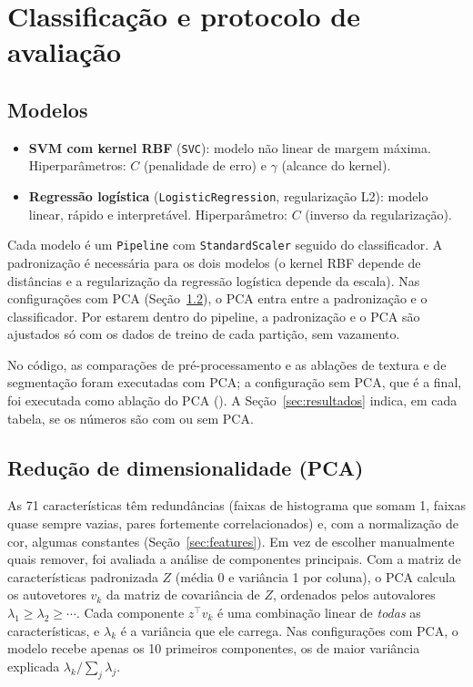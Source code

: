 \documentclass[11pt,a4paper]{article}
\newcommand{\arq}[1]{\path{#1}}
\begin{document}
\section{Classificação e protocolo de avaliação}\label{sec:classificacao}

\subsection{Modelos}

\begin{itemize}
  \item \textbf{SVM com kernel RBF} (\texttt{SVC}): modelo não linear de margem máxima. Hiperparâmetros:
        $C$ (penalidade de erro) e $\gamma$ (alcance do kernel).
  \item \textbf{Regressão logística} (\texttt{LogisticRegression}, regularização L2): modelo linear,
        rápido e interpretável. Hiperparâmetro: $C$ (inverso da regularização).
\end{itemize}

Cada modelo é um \texttt{Pipeline} com \texttt{StandardScaler} seguido do classificador. A
padronização é necessária para os dois modelos (o kernel RBF depende de distâncias e a regularização
da regressão logística depende da escala). Nas configurações com PCA (Seção~\ref{sec:pca}), o PCA
entra entre a padronização e o classificador. Por estarem dentro do pipeline, a padronização e o PCA
são ajustados só com os dados de treino de cada partição, sem vazamento.

No código, as comparações de pré-processamento e as ablações de textura e de segmentação foram
executadas com PCA; a configuração sem PCA, que é a final, foi executada como ablação do PCA
(\arq{outputs/fator2_normalizacao_cor_sem_pca/}). A Seção~\ref{sec:resultados} indica, em cada
tabela, se os números são com ou sem PCA.

\subsection{Redução de dimensionalidade (PCA)}\label{sec:pca}

As 71 características têm redundâncias (faixas de histograma que somam 1, faixas quase sempre vazias,
pares fortemente correlacionados) e, com a normalização de cor, algumas constantes
(Seção~\ref{sec:features}). Em vez de escolher manualmente quais remover, foi avaliada a análise de
componentes principais. Com a matriz de características padronizada $Z$ (média 0 e variância 1 por
coluna), o PCA calcula os autovetores $v_k$ da matriz de covariância de $Z$, ordenados pelos
autovalores $\lambda_1\ge\lambda_2\ge\cdots$. Cada componente $z^\top v_k$ é uma combinação linear de
\emph{todas} as características, e $\lambda_k$ é a variância que ele carrega. Nas configurações com
PCA, o modelo recebe apenas os 10 primeiros componentes, os de maior variância explicada
$\lambda_k / \sum_j \lambda_j$.
\end{document}
